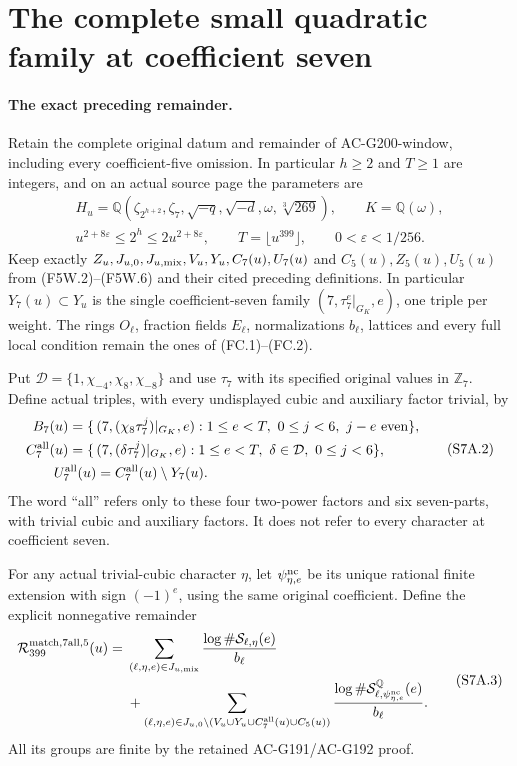 \section{The complete small quadratic family at coefficient seven}
\label{sec:coefficient-seven-full-quadratic-window}

\paragraph{The exact preceding remainder.}
Retain the complete original datum and remainder of
AC-G200-window, including every coefficient-five omission.
In particular $h\geq2$ and $T\geq1$ are integers, and on an
actual source page the parameters are
\[
 \begin{gathered}
 H_u=\mathbb Q(\zeta_{2^{h+2}},\zeta_7,\sqrt{-q},\sqrt{-d},
                 \omega,\sqrt[3]{269}),\qquad K=\mathbb Q(\omega),\\
 u^{2+8\varepsilon}\leq2^h\leq2u^{2+8\varepsilon},\qquad
 T=\lfloor u^{399}\rfloor,\qquad0<\varepsilon<1/256.
 \end{gathered}\tag{S7A.1}
\]
Keep exactly $Z_u,J_{u,0},J_{u,\rm mix},V_u,Y_u,C_7(u),U_7(u)$
and $C_5(u),Z_5(u),U_5(u)$ from (F5W.2)--(F5W.6) and their
cited preceding definitions. In particular $Y_7(u)\subset Y_u$
is the single coefficient-seven family
$(7,\tau_7^e|_{G_K},e)$, one triple per weight.
The rings $O_\ell$, fraction fields $E_\ell$, normalizations
$b_\ell$, lattices and every full local condition remain the
ones of (FC.1)--(FC.2).

Put $\mathcal D=\{1,\chi_{-4},\chi_8,\chi_{-8}\}$ and use
$\tau_7$ with its specified original values in $\mathbb Z_7$.
Define actual triples, with every undisplayed cubic and auxiliary
factor trivial, by
\[
 \begin{split}
 B_7(u)=\{\,&(7,(\chi_8\tau_7^j)|_{G_K},e):
              1\leq e<T,\ 0\leq j<6,\ j-e\text{ even}\},\\
 C_7^{\rm all}(u)=\{\,&(7,(\delta\tau_7^j)|_{G_K},e):
          1\leq e<T,\ \delta\in\mathcal D,\ 0\leq j<6\},\\
 U_7^{\rm all}(u)&=C_7^{\rm all}(u)\setminus Y_7(u).
 \end{split}\tag{S7A.2}
\]
The word ``all'' refers only to these four two-power factors and
six seven-parts, with trivial cubic and auxiliary factors.
It does not refer to every character at coefficient seven.

For any actual trivial-cubic character $\eta$, let
$\psi_{\eta,e}^{\rm nc}$ be its unique rational finite extension
with sign $(-1)^e$, using the same original coefficient.
Define the explicit nonnegative remainder
\[
 \begin{split}
 \mathcal R_{399}^{\rm match,7all,5}(u)={}&
 \sum_{(\ell,\eta,e)\in J_{u,\rm mix}}
                  \frac{\log\#\mathcal S_{\ell,\eta}(e)}{b_\ell}\\
 &+\sum_{(\ell,\eta,e)\in
    J_{u,0}\setminus(V_u\cup Y_u\cup C_7^{\rm all}(u)\cup C_5(u))}
       \frac{\log\#\mathcal S^{\mathbb Q}_{\ell,
                                  \psi_{\eta,e}^{\rm nc}}(e)}{b_\ell}.
 \end{split}\tag{S7A.3}
\]
All its groups are finite by the retained AC-G191/AC-G192 proof.

